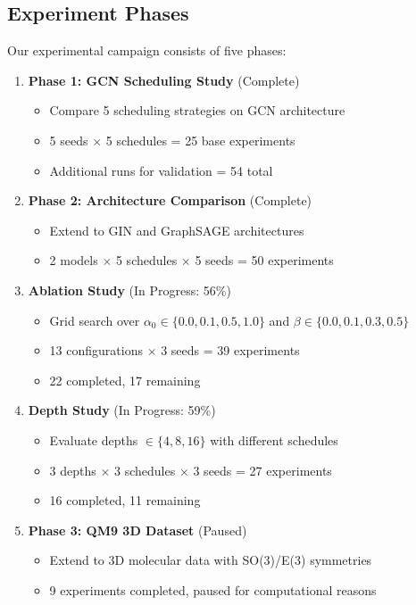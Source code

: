 \documentclass[11pt,a4paper]{article}
\begin{document}
\subsection{Experiment Phases}

Our experimental campaign consists of five phases:

\begin{enumerate}
    \item \textbf{Phase 1: GCN Scheduling Study} (Complete)
    \begin{itemize}
        \item Compare 5 scheduling strategies on GCN architecture
        \item 5 seeds $\times$ 5 schedules = 25 base experiments
        \item Additional runs for validation = 54 total
    \end{itemize}
    
    \item \textbf{Phase 2: Architecture Comparison} (Complete)
    \begin{itemize}
        \item Extend to GIN and GraphSAGE architectures
        \item 2 models $\times$ 5 schedules $\times$ 5 seeds = 50 experiments
    \end{itemize}
    
    \item \textbf{Ablation Study} (In Progress: 56\%)
    \begin{itemize}
        \item Grid search over $\alpha_0 \in \{0.0, 0.1, 0.5, 1.0\}$ and $\beta \in \{0.0, 0.1, 0.3, 0.5\}$
        \item 13 configurations $\times$ 3 seeds = 39 experiments
        \item 22 completed, 17 remaining
    \end{itemize}
    
    \item \textbf{Depth Study} (In Progress: 59\%)
    \begin{itemize}
        \item Evaluate depths $\in \{4, 8, 16\}$ with different schedules
        \item 3 depths $\times$ 3 schedules $\times$ 3 seeds = 27 experiments
        \item 16 completed, 11 remaining
    \end{itemize}
    
    \item \textbf{Phase 3: QM9 3D Dataset} (Paused)
    \begin{itemize}
        \item Extend to 3D molecular data with SO(3)/E(3) symmetries
        \item 9 experiments completed, paused for computational reasons
    \end{itemize}
\end{enumerate}
\end{document}
